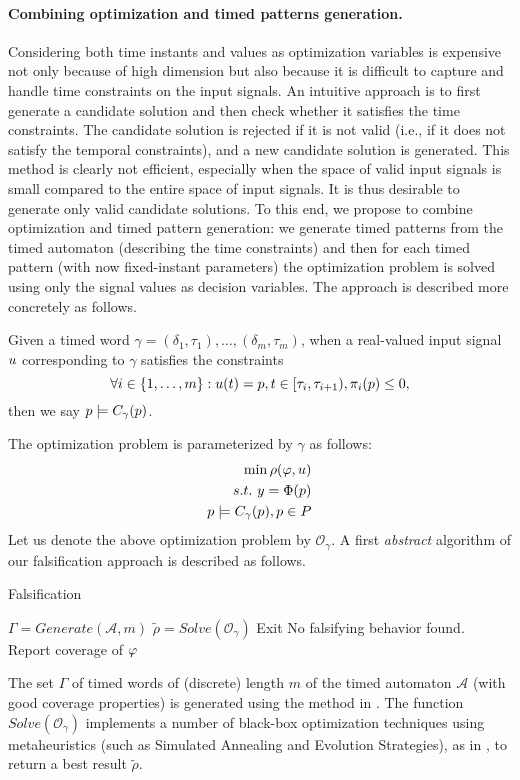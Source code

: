 \paragraph{Combining optimization and timed patterns generation.} Considering  both time instants and values as optimization variables is expensive not only because of high dimension but also because it is difficult to capture and handle time constraints on the input signals. An intuitive approach is to first generate a candidate solution and then check whether it satisfies the time constraints. The candidate solution is rejected if it is not valid (i.e., if it does not satisfy the temporal constraints), and a new candidate solution is generated. This method is clearly not efficient, especially when the space of valid input signals is small compared to the entire space of input signals. It is thus desirable to generate only valid candidate solutions. To this end, we propose to combine optimization and timed pattern generation: we generate timed patterns from the timed automaton (describing the time constraints) and then for each timed pattern (with now fixed-instant parameters) the optimization problem is solved using only the signal values as decision variables. The approach is described more concretely as follows.

Given a timed word $\gamma = (\delta_1, \tau_1), \ldots, (\delta_m, \tau_m)$, when a real-valued input signal $u$ corresponding to $\gamma$ satisfies the constraints
$$\forall i \in \{1, \ldots, m \}: u (t)= p, t \in [\tau_i, \tau_{i+1}), \pi_i(p)  \le 0,$$
then we say $p \models C_{\gamma}(p)$.

The optimization problem is parameterized by $\gamma$ as follows:
\begin{eqnarray} \label{eq:optim2}
\min \rho(\varphi, u) \\ \nonumber
s.t. ~y=\Phi(p) \\ \nonumber
p \models C_{\gamma}(p), p \in P \nonumber
\end{eqnarray}
Let us denote the above optimization problem by $\mathcal{O}_{\gamma}$. A first {\em abstract} algorithm of our falsification approach is described as follows.
\begin{algorithm}
\caption{Falsification}
\begin{algorithmic}
		\State $\Gamma = Generate(\mathcal{A},m)$
	        \ForAll{$\gamma \in \Gamma$} 
		\State $\tilde{\rho} = Solve(\mathcal{O}_{\gamma})$
		  \State Exit	
		\EndIf
		\EndFor
		\State No falsifying behavior found. Report coverage of $\varphi$
\end{algorithmic}
\end{algorithm}
The set $\Gamma$ of timed words of (discrete) length $m$ of the timed automaton $\mathcal{A}$ (with good coverage properties) is generated using the method in \cite{Cosmos}. The function $Solve(\mathcal{O}_{\gamma})$ implements a number of black-box optimization techniques using metaheuristics (such as Simulated Annealing and Evolution Strategies), as in \cite{}, to return a best result $\tilde{\rho}$. 

